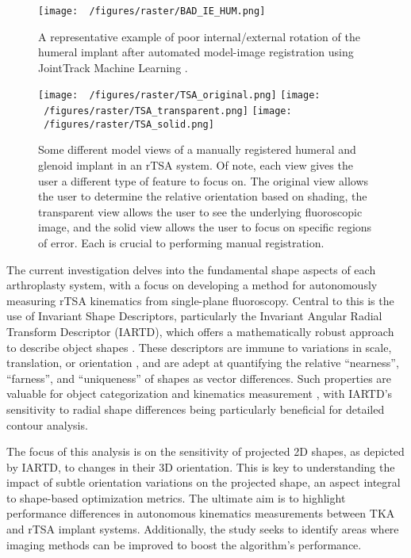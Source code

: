 \begin{figure}[h!]
  \centering
  \texttt{[image: ~/figures/raster/BAD\_IE\_HUM.png]}
  \caption{A representative example of poor internal/external rotation of the humeral implant after automated model-image registration using JointTrack Machine Learning \cite{jensenJointTrackMachine2023}.}
  \label{fig:bad_ie_hum}
\end{figure}


\begin{figure}[h!]
  \centering
  \texttt{[image: ~/figures/raster/TSA\_original.png]}
  \texttt{[image: ~/figures/raster/TSA\_transparent.png]}
  \texttt{[image: ~/figures/raster/TSA\_solid.png]}
  \caption{Some different model views of a manually registered humeral and glenoid implant in an rTSA system. Of note, each view gives the user a different type of feature to focus on. The original view allows the user to determine the relative orientation based on shading, the transparent view allows the user to see the underlying fluoroscopic image, and the solid view allows the user to focus on specific regions of error. Each is crucial to performing manual registration.}
  \label{fig:TSA-multiview}
\end{figure}

The current investigation delves into the fundamental shape aspects of each arthroplasty system, with a focus on developing a method for autonomously measuring rTSA kinematics from single-plane fluoroscopy.
Central to this is the use of Invariant Shape Descriptors, particularly the Invariant Angular Radial Transform Descriptor (IARTD), which offers a mathematically robust approach to describe object shapes \cite{leeNewShapeDescription2012}.
These descriptors are immune to variations in scale, translation, or orientation \cite{zhangReviewShapeRepresentation2004}, and are adept at quantifying the relative ``nearness'', ``farness'', and ``uniqueness'' of shapes as vector differences.
Such properties are valuable for object categorization \cite{richardIdentificationThreeDimensionalObjects1974,wallaceAnalysisThreedimensionalMovement1980,wallaceEfficientThreedimensionalAircraft1980} and kinematics measurement \cite{banksAccurateMeasurementThreedimensional1996}, with IARTD's sensitivity to radial shape differences \cite{leeNewShapeDescription2012} being particularly beneficial for detailed contour analysis.

The focus of this analysis is on the sensitivity of projected 2D shapes, as depicted by IARTD, to changes in their 3D orientation.
This is key to understanding the impact of subtle orientation variations on the projected shape, an aspect integral to shape-based optimization metrics.
The ultimate aim is to highlight performance differences in autonomous kinematics measurements between TKA and rTSA implant systems.
Additionally, the study seeks to identify areas where imaging methods can be improved to boost the algorithm's performance.

